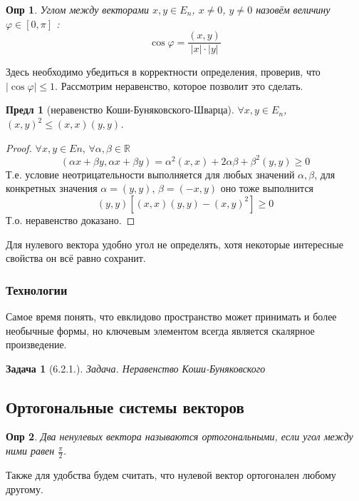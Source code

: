 \documentclass[a4paper,12pt]{article}
\newtheorem*{definition}{Опр}
\newtheorem{propos}{Предл}[section]
\newtheorem*{prob}{Задача}
\begin{document}
\begin{definition}
	Углом между векторами $x, y \in E_n$, $x \ne 0$, $y \ne 0$ назовём величину $\varphi \in [0, 
	\pi]$ :
	\[
		\cos \varphi = \dfrac{(x,y)}{|x| \cdot |y|}
	\]
\end{definition}

Здесь необходимо убедиться в корректности определения, проверив, что $|\cos \varphi| \le 1$. Рассмотрим неравенство, которое позволит это сделать. 

\begin{propos}[неравенство Коши-Буняковского-Шварца]
	$\forall x,y \in E_n$, $(x,y)^2 \le (x,x) (y,y)$.
\end{propos}
\begin{proof}
	$\forall x,y \in En$, $\forall \alpha, \beta \in \mathbb{R}$
	\[
		(\alpha x + \beta y, \alpha x + \beta y) = \alpha^2  (x,x) + 2 \alpha \beta + \beta^2 (y,y) \ge 0
	\]
	Т.е. условие неотрицательности выполняется для любых значений $\alpha, \beta$, для конкретных значения $\alpha = (y,y)$, $\beta=(-x,y)$ оно тоже выполнится
	\[
		(y,y)[(x,x)(y,y) - (x,y)^2] \ge 0
	\]
	Т.о. неравенство доказано. 	
\end{proof}

Для нулевого вектора удобно угол не определять, хотя некоторые интересные свойства он всё равно сохранит.

\subsubsection{Технологии}

Самое время понять, что евклидово пространство может принимать и более необычные формы, но ключевым элементом всегда является скалярное произведение.

\begin{prob}[6.2.1.]
	Задача. Неравенство Коши-Буняковского
\end{prob}

\subsection{Ортогональные системы векторов}

\begin{definition}
	Два ненулевых вектора называются ортогональными, если угол между ними равен $\frac{\pi}{2}$.
\end{definition}

Также для удобства будем считать, что нулевой вектор ортогонален любому другому.
\end{document}
